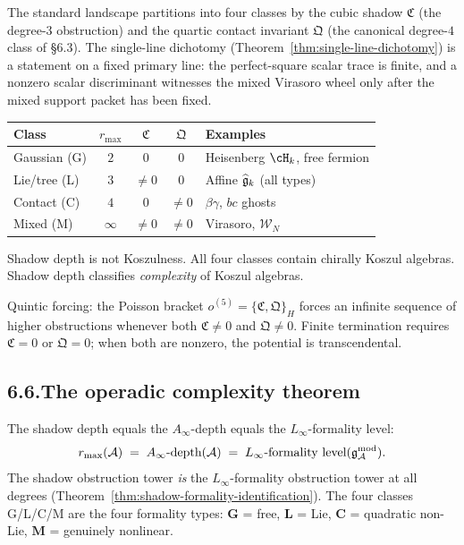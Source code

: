 The standard landscape partitions into four classes
by the cubic shadow $\mathfrak C$ (the degree-$3$ obstruction)
and the quartic contact invariant $\mathfrak Q$ (the
canonical degree-$4$ class of \S6.3). The single-line
dichotomy (Theorem~\ref{thm:single-line-dichotomy}) is a statement on
a fixed primary line: the perfect-square scalar trace is finite, and a
nonzero scalar discriminant witnesses the mixed Virasoro wheel only
after the mixed support packet has been fixed.

\begin{center}
\renewcommand{\arraystretch}{1.3}
\begin{tabular}{lcccl}
\textbf{Class} & $r_{\max}$
 & $\mathfrak C$ & $\mathfrak Q$
 & \textbf{Examples}\\
\hline
Gaussian (G) & $2$ & $0$ & $0$
 & Heisenberg $\cH_k$, free fermion\\
Lie/tree (L) & $3$ & $\neq 0$ & $0$
 & Affine $\widehat{\mathfrak{g}}_k$ (all types)\\
Contact (C) & $4$ & $0$ & $\neq 0$
 & $\beta\gamma$, $bc$ ghosts\\
Mixed (M) & $\infty$ & $\neq 0$ & $\neq 0$
 & Virasoro, $\mathcal W_N$
\end{tabular}
\end{center}

Shadow depth is not Koszulness. All four classes contain
chirally Koszul algebras. Shadow depth classifies
\emph{complexity} of Koszul algebras.

Quintic forcing: the Poisson bracket
$o^{(5)}=\{\mathfrak C,\mathfrak Q\}_H$ forces an infinite
sequence of higher obstructions whenever both $\mathfrak C\neq 0$
and $\mathfrak Q\neq 0$. Finite termination requires
$\mathfrak C=0$ or $\mathfrak Q=0$; when both are nonzero, the
potential is transcendental.

\subsection*{6.6.\enspace The operadic complexity theorem}

The shadow depth equals the $A_\infty$-depth equals the
$L_\infty$-formality level:
\[
r_{\max}(\mathcal{A})
\;=\;
A_\infty\text{-depth}(\mathcal{A})
\;=\;
L_\infty\text{-formality level}(\mathfrak{g}_{\mathcal{A}}^{\mathrm{mod}}).
\]
The shadow obstruction tower \emph{is} the $L_\infty$-formality
obstruction tower at all degrees
(Theorem~\ref{thm:shadow-formality-identification}). The four
classes G/L/C/M are the four formality types:
$\mathbf{G}$ = free,
$\mathbf{L}$ = Lie,
$\mathbf{C}$ = quadratic non-Lie,
$\mathbf{M}$ = genuinely nonlinear.

